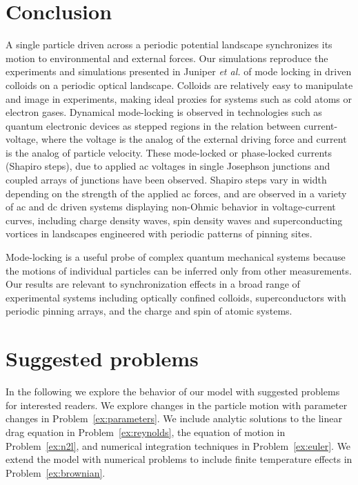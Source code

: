 \documentclass[preprint,showpacs,preprintnumbers,amsmath,amssymb,aps,prb]{revtex4-1}
\theoremstyle{remark}
\begin{document}
\section{Conclusion}
\label{sec:conclusion}	
A single particle driven across a periodic potential landscape 
synchronizes its motion 
to environmental and external forces.  
Our simulations reproduce the experiments and simulations presented in 
Juniper {\it et al.} \cite{Juniper2015, Juniper2017}
of 
mode locking in
driven colloids on a
periodic optical landscape.
Colloids are 
relatively easy to 
manipulate and image in experiments,
making ideal proxies 
for systems 
such as cold atoms or electron gases.\cite{Grier2003}
Dynamical mode-locking 
is 
observed in  technologies such as 
 quantum electronic
devices as 
stepped regions in the relation between current-voltage,
where the voltage is the analog of the external driving force
and current is the analog of particle velocity.
These mode-locked or phase-locked currents (Shapiro steps), 
due to applied ac voltages in 
single Josephson junctions\cite{Shapiro1963, Golubov2004} and
coupled arrays of junctions have been observed.\cite{Benz1990}
Shapiro steps vary in width depending on the strength of the
applied ac forces,
and are observed in a variety of ac and dc driven systems
displaying
non-Ohmic behavior in voltage-current curves,
including
charge density waves, spin density waves
and superconducting vortices in landscapes 
engineered with periodic patterns of pinning sites.\cite{Reichhardt2000}

Mode-locking is a useful probe 
of complex quantum mechanical systems
because the motions of individual particles can  be inferred only
from other measurements.
Our results are relevant 
to synchronization effects
in a broad range of experimental systems
including optically confined colloids,
superconductors with periodic pinning arrays, 
and the charge and spin of atomic systems.

\section{Suggested problems}
\label{sec:problems}	

In the following
we explore the behavior of our model
with suggested problems for interested readers.
We explore changes in the particle motion
with parameter changes in Problem~\ref{ex:parameters}.
We include analytic solutions to  the 
linear drag equation in Problem~\ref{ex:reynolds}, 
the equation of motion in Problem~\ref{ex:n2l},
and 
numerical integration techniques in Problem~\ref{ex:euler}.
We extend the model with
numerical problems 
to include finite temperature effects
in Problem~\ref{ex:brownian}.
\end{document}

